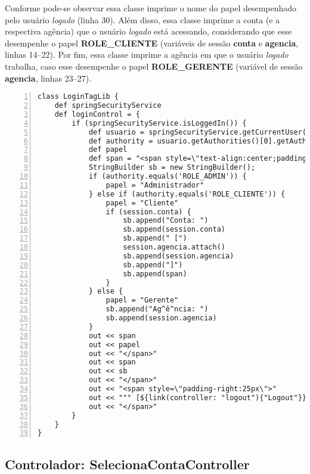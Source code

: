 \vspace{0.2cm}

Conforme pode-se observar essa classe  imprime o nome do papel desempenhado pelo
usuário {\it logado}  (linha 30).  Além disso, essa classe imprime  a conta (e a
respectiva agência) que o usuário  {\it logado} está acessando, considerando que
esse desempenhe o  papel {\bf ROLE\_CLIENTE} (variáveis de  sessão {\bf conta} e
{\bf agencia}, linhas  14--22). Por fim, essa classe imprime a  agência em que o
usuário {\it logado} trabalha, caso  esse desempenhe o papel {\bf ROLE\_GERENTE}
(variável de sessão {\bf agencia}, linhas 23--27).  

\begin{lstlisting}[caption=Biblioteca  de marca  {\bf  LoginTagLib}, frame=trBL,
    float=htbp, label=codTagLib2, numbers=left] 
class LoginTagLib {
    def springSecurityService
    def loginControl = {
        if (springSecurityService.isLoggedIn()) {
            def usuario = springSecurityService.getCurrentUser()
            def authority = usuario.getAuthorities()[0].getAuthority()
            def papel
            def span = "<span style=\"text-align:center;padding-left:25px;padding-right:25px\">"
            StringBuilder sb = new StringBuilder();
            if (authority.equals('ROLE_ADMIN')) {
                papel = "Administrador"
            } else if (authority.equals('ROLE_CLIENTE')) {
                papel = "Cliente"
                if (session.conta) {
                    sb.append("Conta: ")
                    sb.append(session.conta)
                    sb.append(" [")
                    session.agencia.attach()
                    sb.append(session.agencia)
                    sb.append("]")
                    sb.append(span)
                }
            } else {
                papel = "Gerente"
                sb.append("Ag^ê^ncia: ")
                sb.append(session.agencia)
            }
            out << span
            out << papel
            out << "</span>"
            out << span
            out << sb
            out << "</span>"
            out << "<span style=\"padding-right:25px\">"
            out << """ [${link(controller: "logout"){"Logout"}}]"""
            out << "</span>"
        }
    }
}
\end{lstlisting}

\subsection{Controlador: SelecionaContaController}\label{secSeleciona}

